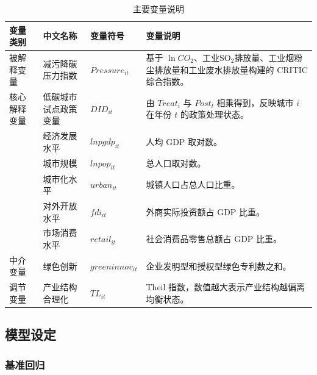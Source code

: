 \documentclass[12pt,a4paper]{ctexart}
\newcommand{\tablefont}{\songti\fontsize{10.5pt}{14pt}\selectfont}
\begin{document}
\begin{table}[H]
    \centering
    \caption{主要变量说明}
    \label{tab:variables}
    \begin{threeparttable}
    \tablefont
    \renewcommand{\arraystretch}{1.45}
    \setlength{\extrarowheight}{2pt}
    \setlength{\tabcolsep}{1pt}
    \renewcommand{\tabularxcolumn}[1]{>{\raggedright\arraybackslash}m{#1}}
    \begin{tabularx}{\textwidth}{>{\centering\arraybackslash}m{2.45cm}>{\centering\arraybackslash}m{4.0cm}>{\centering\arraybackslash}m{2.2cm}>{\raggedright\arraybackslash}X}
        \toprule
        变量类别 & 中文名称 & 变量符号 & 变量说明 \\
        \midrule
        被解释变量 & 减污降碳压力指数 & $Pressure_{it}$ & 基于 $\ln CO_2$、工业SO$_2$排放量、工业烟粉尘排放量和工业废水排放量构建的 CRITIC 综合指数。 \\
        \midrule
        核心解释变量 & 低碳城市试点政策变量 & $DID_{it}$ & 由 $Treat_i$ 与 $Post_t$ 相乘得到，反映城市 $i$ 在年份 $t$ 的政策处理状态。 \\
        \midrule
        \multirow{5}{*}{控制变量} & 经济发展水平 & $lnpgdp_{it}$ & 人均 GDP 取对数。 \\
        & 城市规模 & $lnpop_{it}$ & 总人口取对数。 \\
        & 城市化水平 & $urban_{it}$ & 城镇人口占总人口比重。 \\
        & 对外开放水平 & $fdi_{it}$ & 外商实际投资额占 GDP 比重。 \\
        & 市场消费水平 & $retail_{it}$ & 社会消费品零售总额占 GDP 比重。 \\
        \midrule
        中介变量 & 绿色创新 & $greeninnov_{it}$ & 企业发明型和授权型绿色专利数之和。 \\
        \midrule
        调节变量 & 产业结构合理化 & $TL_{it}$ & Theil 指数，数值越大表示产业结构越偏离均衡状态。 \\
        \bottomrule
    \end{tabularx}
    \end{threeparttable}
\end{table}

\subsection{模型设定}

\subsubsection{基准回归}
\end{document}
